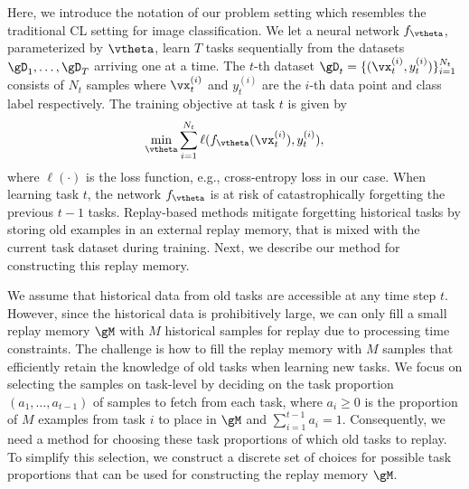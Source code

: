 Here, we introduce the notation of our problem setting which resembles the traditional CL setting for image classification. We let a neural network $f_{\vtheta}$, parameterized by $\vtheta$, learn $T$ tasks sequentially from the datasets $\gD_1, \dots, \gD_T$ arriving one at a time. %
The $t$-th dataset $\gD_t = \{(\vx_{t}^{(i)}, y_{t}^{(i)})\}_{i=1}^{N_{t}}$ consists of $N_t$ samples where $\vx_{t}^{(i)}$ and $y_{t}^{(i)}$ are the $i$-th data point and class label respectively. The training objective at task $t$ is given by 
\begin{align}
    \underset{\vtheta}{\text{min}} \sum_{i=1}^{N_t} \ell(f_{\vtheta}(\vx_t^{(i)}), y_{t}^{(i)}),
\end{align}
where $\ell(\cdot)$ is the loss function, e.g., cross-entropy loss in our case. 
When learning task $t$, the network $f_{\vtheta}$ is at risk of catastrophically forgetting the previous $t-1$ tasks.  
Replay-based methods mitigate forgetting historical tasks by storing old examples in an external replay memory, that is mixed with the current task dataset during training. 
Next, we describe our method for constructing this replay memory.  

We assume that historical data from old tasks are accessible at any time step $t$. However, since the historical data is prohibitively large, we can only fill a small replay memory $\gM$ with $M$ historical samples for replay due to processing time constraints. 
The challenge is how to fill the replay memory with $M$ samples that efficiently retain the knowledge of old tasks when learning new tasks. We focus on selecting the samples on task-level by deciding on the task proportion $(a_1, \dots, a_{t-1})$ of samples to fetch from each task, where $a_{i} \geq 0$ is the proportion of $M$ examples from task $i$ to place in $\gM$ and $\sum_{i=1}^{t-1} a_i = 1$. Consequently, we need a method for choosing these task proportions of which old tasks to replay. 
To simplify this selection, we construct a discrete set of choices for possible task proportions that can be used for constructing the replay memory $\gM$.



